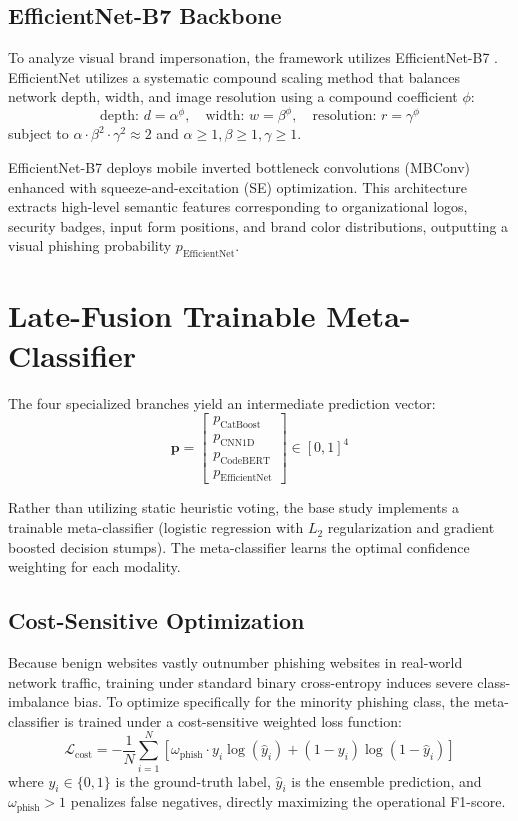 \subsection{EfficientNet-B7 Backbone}
To analyze visual brand impersonation, the framework utilizes EfficientNet-B7 \cite{7}. EfficientNet utilizes a systematic compound scaling method that balances network depth, width, and image resolution using a compound coefficient $\phi$:
\begin{equation}
\text{depth: } d = \alpha^\phi, \quad \text{width: } w = \beta^\phi, \quad \text{resolution: } r = \gamma^\phi
\label{eq:effnet}
\end{equation}
subject to $\alpha \cdot \beta^2 \cdot \gamma^2 \approx 2$ and $\alpha \ge 1, \beta \ge 1, \gamma \ge 1$.

EfficientNet-B7 deploys mobile inverted bottleneck convolutions (MBConv) enhanced with squeeze-and-excitation (SE) optimization. This architecture extracts high-level semantic features corresponding to organizational logos, security badges, input form positions, and brand color distributions, outputting a visual phishing probability $p_{\text{EfficientNet}}$.

\section{Late-Fusion Trainable Meta-Classifier}
The four specialized branches yield an intermediate prediction vector:
\begin{equation}
\mathbf{p} = \begin{bmatrix} p_{\text{CatBoost}} \\ p_{\text{CNN1D}} \\ p_{\text{CodeBERT}} \\ p_{\text{EfficientNet}} \end{bmatrix} \in [0, 1]^4
\label{eq:pvec}
\end{equation}

Rather than utilizing static heuristic voting, the base study implements a trainable meta-classifier (logistic regression with $L_2$ regularization and gradient boosted decision stumps). The meta-classifier learns the optimal confidence weighting for each modality.

\subsection{Cost-Sensitive Optimization}
Because benign websites vastly outnumber phishing websites in real-world network traffic, training under standard binary cross-entropy induces severe class-imbalance bias. To optimize specifically for the minority phishing class, the meta-classifier is trained under a cost-sensitive weighted loss function:
\begin{equation}
\mathcal{L}_{\text{cost}} = -\frac{1}{N} \sum_{i=1}^N \left[\omega_{\text{phish}} \cdot y_i \log(\hat{y}_i) + (1 - y_i) \log(1 - \hat{y}_i)\right]
\label{eq:cost_loss}
\end{equation}
where $y_i \in \{0, 1\}$ is the ground-truth label, $\hat{y}_i$ is the ensemble prediction, and $\omega_{\text{phish}} > 1$ penalizes false negatives, directly maximizing the operational F1-score.

